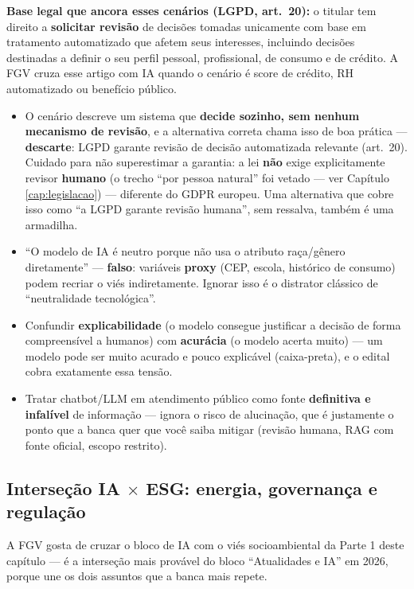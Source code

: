 \textbf{Base legal que ancora esses cenários (LGPD, art.\ 20):} o titular tem
direito a \textbf{solicitar revisão} de decisões tomadas unicamente com base
em tratamento automatizado que afetem seus interesses, incluindo decisões
destinadas a definir o seu perfil pessoal, profissional, de consumo e de
crédito. A FGV cruza esse artigo com IA quando o cenário é score de crédito,
RH automatizado ou benefício público.

\begin{pegadinha}
\begin{itemize}
\item O cenário descreve um sistema que \textbf{decide sozinho, sem nenhum
mecanismo de revisão}, e a alternativa correta chama isso de boa prática ---
\textbf{descarte}: LGPD garante revisão de decisão automatizada relevante
(art.\ 20). Cuidado para não superestimar a garantia: a lei \textbf{não}
exige explicitamente revisor \textbf{humano} (o trecho ``por pessoa
natural'' foi vetado --- ver Capítulo \ref{cap:legislacao}) --- diferente
do GDPR europeu. Uma alternativa que cobre isso como ``a LGPD garante
revisão humana'', sem ressalva, também é uma armadilha.
\item ``O modelo de IA é neutro porque não usa o atributo raça/gênero
diretamente'' --- \textbf{falso}: variáveis \textbf{proxy} (CEP, escola,
histórico de consumo) podem recriar o viés indiretamente. Ignorar isso é o
distrator clássico de ``neutralidade tecnológica''.
\item Confundir \textbf{explicabilidade} (o modelo consegue justificar a
decisão de forma compreensível a humanos) com \textbf{acurácia} (o modelo
acerta muito) --- um modelo pode ser muito acurado e pouco explicável (caixa-preta), e o edital cobra exatamente essa tensão.
\item Tratar chatbot/LLM em atendimento público como fonte \textbf{definitiva
e infalível} de informação --- ignora o risco de alucinação, que é
justamente o ponto que a banca quer que você saiba mitigar (revisão humana,
RAG com fonte oficial, escopo restrito).
\end{itemize}
\end{pegadinha}

\subsection{Interseção IA $\times$ ESG: energia, governança e regulação}

A FGV gosta de cruzar o bloco de IA com o viés socioambiental da Parte 1
deste capítulo --- é a interseção mais provável do bloco ``Atualidades e IA''
em 2026, porque une os dois assuntos que a banca mais repete.


